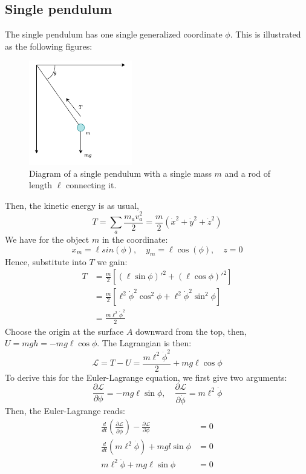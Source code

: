 \subsection{Single pendulum}
The single pendulum has one single generalized coordinate $\phi$. This is illustrated as the following figures:
\begin{figure}[htb]
  \centering
  \includegraphics[width=0.4\textwidth]{img/expreise.png}
  \caption{Diagram of a single pendulum with a single mass $m$ and a rod of length $\ell$ connecting it.}
  \label{fig:pendulum1a}
\end{figure}
Then, the kinetic energy is as usual,
\begin{equation}
    T = \sum_{a} \frac{m_{a}v_{a}^{2}}{2} = \frac{m}{2} (\dot{x}^{2}+ \dot{y}^{2}+ \dot{z}^{2})
\end{equation}
We have for the object $m$ in the coordinate: 
\begin{equation}
    x_{m} = \ell sin{(\phi)}, \quad y_{m} = \ell \cos{(\phi)} , \quad z= 0
\end{equation}
Hence, substitute into $T$ we gain: 
\begin{equation}
    \begin{split}
        T & = \frac{m}{2} \left[  (\ell \sin{\phi})'^{2} + (\ell \cos{\phi})'^{2} \right]\\
        & = \frac{m}{2} \left[ \ell^{2} \dot{\phi}^{2}\cos^{2}{\phi} + \ell^{2} \dot{\phi}^{2}\sin^{2}{\phi}  \right]\\
        & = \frac{m \ell^{2}\dot{\phi}^{2}}{2}
    \end{split}
\end{equation}
Choose the origin at the surface $A$ downward from the top, then, $U=mgh=-mg\ell \cos{\phi}$. The Lagrangian is then: 
\begin{equation}
    \mathcal{L} = T-U = \frac{m \ell^{2}\dot{\phi}^{2}}{2} + mg\ell \cos{\phi}
\end{equation}
To derive this for the Euler-Lagrange equation, we first give two arguments: 
\begin{equation}
    \frac{\partial \mathcal{L}}{\partial \phi} = -mg\ell\sin{\phi}, \quad \frac{\partial \mathcal{L}}{\partial \dot{\phi}} = m\ell^{2}\dot{\phi}
\end{equation}
Then, the Euler-Lagrange reads:
\begin{align}
    \frac{d}{dt} \left( \frac{\partial \mathcal{L}}{\partial \dot{\phi}} \right) - \frac{\partial \mathcal{L}}{\partial \phi} &= 0 \\
    \frac{d}{dt} (m\ell^{2}\dot{\phi}) + mgl\sin{\phi} & = 0\\ 
    m\ell^{2} \ddot{\phi} + mg\ell \sin{\phi} & = 0
\end{align}
